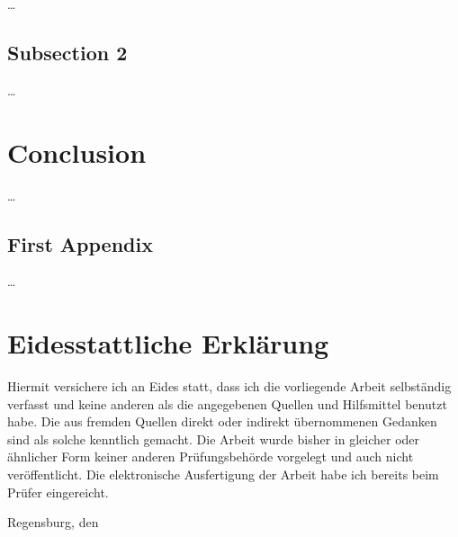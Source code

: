 \dots

\section{Subsection 2}
\label{ch:discussion:sec:subsection2}

\dots

\chapter{Conclusion}
\label{ch:conclusion}

\dots


{}

{}	%
{}	%

\pagebreak





\pagebreak
\appendix

{}	%
{}	%


\section{First Appendix}   %
\label{AppendixA}  
\setcounter{figure}{0}

\dots


\pagebreak


\chapter*{Eidesstattliche Erklärung}
\label{ch:Declaration}

Hiermit versichere ich an Eides statt, dass ich die vorliegende Arbeit selbständig verfasst und keine anderen als die angegebenen Quellen und Hilfsmittel benutzt habe. Die aus fremden Quellen direkt oder indirekt übernommenen Gedanken sind als solche kenntlich gemacht. Die Arbeit wurde bisher in gleicher oder ähnlicher Form keiner anderen Prüfungsbehörde vorgelegt und auch nicht veröffentlicht.
Die elektronische Ausfertigung der Arbeit habe ich bereits beim Prüfer eingereicht.

\vspace*{1cm}
\hspace*{4cm} Regensburg, den \submissiontime \hspace*{0.5cm}\hrulefill \\
\hspace*{10.5cm} \myname \\







